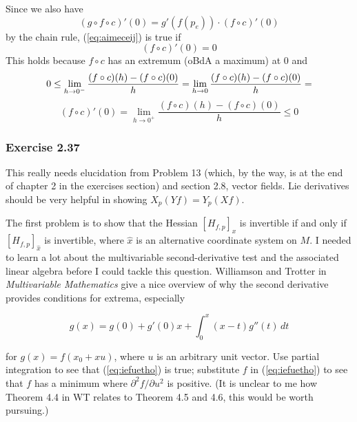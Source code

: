 \documentclass[12pt]{article}
\begin{document}
Since we also have
\begin{equation}
  \label{eq:quauluog}
  (g\circ{}f\circ{}c)'(0)=g'(f(p_{e}))\cdot(f\circ{}c)'(0)
\end{equation}
by the chain rule, (\ref{eq:aimeceij}) is true if
\begin{equation}
  \label{eq:ohnienga}
  (f\circ{}c)'(0)=0
\end{equation}
This holds because $f\circ{}c$ has an extremum (oBdA a maximum) at $0$
and
\begin{equation}
  \label{eq:fiofooci}
  0\leq\lim_{h\rightarrow{}0^{-}}\frac{(f\circ{}c)(h)-(f\circ{}c)(0)}{h}=\lim_{h\rightarrow{}0}\frac{(f\circ{}c)(h)-(f\circ{}c)(0)}{h}=\notag
\end{equation}
\begin{equation}
  \label{eq:shohcath}
  (f\circ{}c)'(0)=\lim_{h\rightarrow{}0^{+}}\frac{(f\circ{}c)(h)-(f\circ{}c)(0)}{h}\leq{}0
\end{equation}

\subsubsection{Exercise 2.37}
\label{subsubsection:aijeiloj}

This really needs elucidation from Problem 13 (which, by the way, is
at the end of chapter 2 in the exercises section) and section 2.8,
vector fields. Lie derivatives should be very helpful in showing
$X_{p}(Yf)=Y_{p}(Xf)$.

The first problem is to show that the Hessian $[H_{f,p}]_{x}$ is
invertible if and only if $[H_{f,p}]_{\hat{x}}$ is invertible, where
$\hat{x}$ is an alternative coordinate system on $M$. I needed to
learn a lot about the multivariable second-derivative test and the
associated linear algebra before I could tackle this question.
Williamson and Trotter in \emph{Multivariable Mathematics} give a nice
overview of why the second derivative provides conditions for extrema,
especially

\begin{equation}
  \label{eq:iefuetho}
  g(x)=g(0)+g'(0)x+\int_{0}^{x}(x-t)g''(t)\,dt
\end{equation}

for $g(x)=f(x_{0}+xu)$, where $u$ is an arbitrary unit vector. Use
partial integration to see that (\ref{eq:iefuetho}) is true;
substitute $f$ in (\ref{eq:iefuetho}) to see that $f$ has a minimum
where $\partial^{2}f/\partial{}u^{2}$ is positive. (It is unclear to
me how Theorem 4.4 in WT relates to Theorem 4.5 and 4.6, this would be
worth pursuing.)
\end{document}
